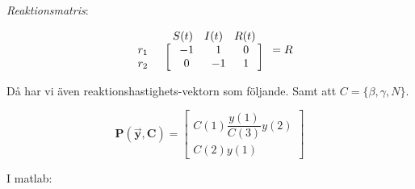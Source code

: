 \begin{multicols}{2}
\textit{Reaktionsmatris}:
\begin{center}
\begin{equation*}
\begin{array}{c c} &
\begin{array}{c c c} S(t) & I(t) & R(t) \\
\end{array}
\\
\begin{array}{c c}
r_1 \\
r_2 
\end{array}
&
\left[
\begin{array}{c c c}
\; -1 \; & \;  1 \; & \; 0 \; \\
\;  0 \; & \; -1 \; & \; 1 \; 
\end{array}
\right]
\end{array} = R
\end{equation*}
\end{center}

Då har vi även reaktionshastighets-vektorn som följande. \newline
Samt att $C = \{ \beta, \gamma, N \}$.

\begin{equation*}
    \mathbf{P(\Vec{y}, C)}=
    \begin{bmatrix}
        C(1)\dfrac{y(1)}{C(3)}y(2) \\
        C(2)y(1)
    \end{bmatrix}
\end{equation*}

I matlab: 


\end{multicols}
